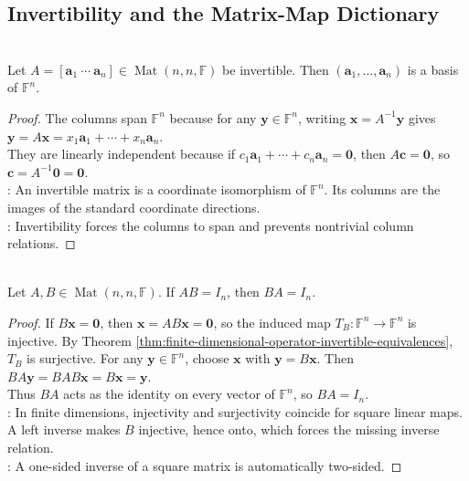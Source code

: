 \subsection{Invertibility and the Matrix-Map Dictionary}
\begin{theorem} \label{thm:invertible-matrix-columns-basis} \\
Let $A=[\mathbf{a}_1\ \cdots\ \mathbf{a}_n]\in\operatorname{Mat}(n,n,\mathbb{F})$ be invertible. Then $(\mathbf{a}_1,\ldots,\mathbf{a}_n)$ is a basis of $\mathbb{F}^n$.
\begin{proof}
The columns span $\mathbb{F}^n$ because for any $\mathbf{y}\in\mathbb{F}^n$, writing $\mathbf{x}=A^{-1}\mathbf{y}$ gives $\mathbf{y}=A\mathbf{x}=x_1\mathbf{a}_1+\cdots+x_n\mathbf{a}_n$.\\
They are linearly independent because if $c_1\mathbf{a}_1+\cdots+c_n\mathbf{a}_n=\mathbf{0}$, then $A\mathbf{c}=\mathbf{0}$, so $\mathbf{c}=A^{-1}\mathbf{0}=\mathbf{0}$.\\
: An invertible matrix is a coordinate isomorphism of $\mathbb{F}^n$. Its columns are the images of the standard coordinate directions.\\
: Invertibility forces the columns to span and prevents nontrivial column relations.
\end{proof}
\end{theorem}

\begin{theorem} \label{thm:square-one-sided-inverse-is-two-sided} \\
Let $A,B\in\operatorname{Mat}(n,n,\mathbb{F})$. If $AB=I_n$, then $BA=I_n$.
\begin{proof}
If $B\mathbf{x}=\mathbf{0}$, then $\mathbf{x}=AB\mathbf{x}=\mathbf{0}$, so the induced map $T_B:\mathbb{F}^n\to\mathbb{F}^n$ is injective. By Theorem \ref{thm:finite-dimensional-operator-invertible-equivalences}, $T_B$ is surjective. For any $\mathbf{y}\in\mathbb{F}^n$, choose $\mathbf{x}$ with $\mathbf{y}=B\mathbf{x}$. Then $BA\mathbf{y}=BAB\mathbf{x}=B\mathbf{x}=\mathbf{y}$.\\
Thus $BA$ acts as the identity on every vector of $\mathbb{F}^n$, so $BA=I_n$.\\
: In finite dimensions, injectivity and surjectivity coincide for square linear maps. A left inverse makes $B$ injective, hence onto, which forces the missing inverse relation.\\
: A one-sided inverse of a square matrix is automatically two-sided.
\end{proof}
\end{theorem}

